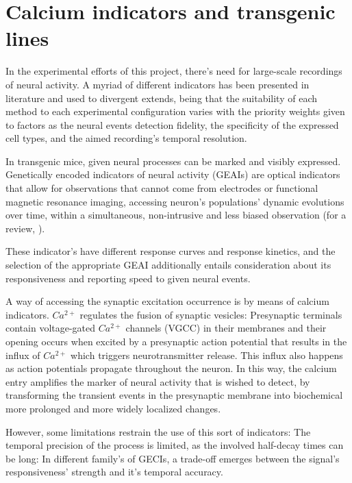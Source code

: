 \section{Calcium indicators and transgenic lines}
\label{sec:sectionb}


In the experimental efforts of this project, there's need for large-scale recordings of neural activity. A myriad of different indicators has been presented in literature and used to divergent extends, being that the suitability of each method to each experimental configuration varies with the priority weights given to factors as the neural events detection fidelity, the specificity of the expressed cell types, and the aimed recording's temporal resolution.

In transgenic mice, given neural processes can be marked and visibly expressed. Genetically encoded indicators of neural activity (GEAIs) are optical indicators that allow for observations that cannot come from electrodes or functional magnetic resonance imaging, accessing neuron's populations' dynamic evolutions over time, within a simultaneous, non-intrusive and less biased observation (for a review, \cite{Lin2016}).

These indicator's have different response curves and response kinetics, and the selection of the appropriate GEAI additionally entails consideration about its responsiveness and reporting speed to given neural events.

A way of accessing the synaptic excitation occurrence is by means of calcium indicators. $Ca^{2+}$ regulates the fusion of synaptic vesicles: Presynaptic terminals contain voltage-gated $Ca^{2+}$ channels (VGCC) in their membranes and their opening occurs when excited by a presynaptic action potential that results in the influx of $Ca^{2+}$ which triggers neurotransmitter release. This influx also happens as action potentials propagate throughout the neuron. In this way, the calcium entry amplifies the marker of neural activity that is wished to detect, by transforming the transient events in the presynaptic membrane into biochemical more prolonged and more widely localized changes.

However, some limitations restrain the use of this sort of indicators: The temporal precision of the process is limited, as the involved half-decay times can be long: In different family's of GECIs, a trade-off emerges between the signal's responsiveness' strength and it's temporal accuracy.

